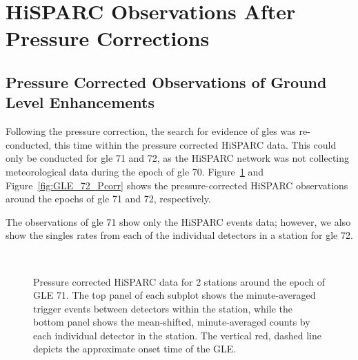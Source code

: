  

\section{HiSPARC Observations After Pressure Corrections}\label{sec:HS_obs_Pcorr}


\subsection{Pressure Corrected Observations of Ground Level Enhancements}

Following the pressure correction, the search for evidence of \glspl{gle} was re-conducted, this time within the pressure corrected HiSPARC data. This could only be conducted for \gls{gle} 71 and 72, as the HiSPARC network was not collecting meteorological data during the epoch of \gls{gle} 70. Figure~\ref{fig:GLE_71_Pcorr} and Figure~\ref{fig:GLE_72_Pcorr} shows the pressure-corrected HiSPARC observations around the epochs of \gls{gle} 71 and 72, respectively.

The observations of \gls{gle} 71 show only the HiSPARC events data; however, we also show the singles rates from each of the individual detectors in a station for \gls{gle} 72.

\begin{figure}[ht]
	\centering
	 \\
	
	
	\caption{Pressure corrected HiSPARC data for 2 stations around the epoch of GLE 71. The top panel of each subplot shows the minute-averaged trigger events between detectors within the station, while the bottom panel shows the mean-shifted, minute-averaged counts by each individual detector in the station. The vertical red, dashed line depicts the approximate onset time of the GLE.}
	\label{fig:GLE_71_Pcorr}
\end{figure}


